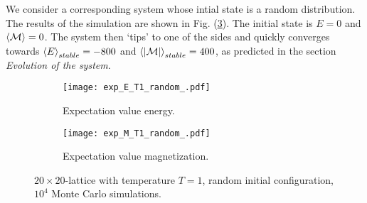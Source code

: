 \documentclass[11pt]{article}
\begin{document}
\begin{flushleft}
We consider a corresponding system whose intial state is a random distribution. The results of the simulation are shown in Fig. (\ref{fig:cms-EM T=1 random}). The initial state is $E=0$ and $\braket{\mathcal{M}}= 0$. The system then `tips' to one of the sides and quickly converges towards $\braket{E}_{stable}=-800$ and $\braket{|\mathcal{M}|}_{stable}=400$, as predicted in the section \textit{Evolution of the system}. 

\begin{figure}[H]
\centering
\begin{subfigure}{.5\textwidth}
  \centering
  \texttt{[image: exp\_E\_T1\_random\_.pdf]}
  \caption{Expectation value energy.}
  \label{fig:sub1}
\end{subfigure}%
\begin{subfigure}{.5\textwidth}
  \centering
  \texttt{[image: exp\_M\_T1\_random\_.pdf]}
  \caption{Expectation value magnetization.}
  \label{fig:sub2}
\end{subfigure}
\caption{$20 \times 20$-lattice with temperature $T=1$, random initial configuration, $10^4$ Monte Carlo simulations.}
\label{fig:cms-EM T=1 random}
\end{figure}
\end{flushleft}
\end{document}
